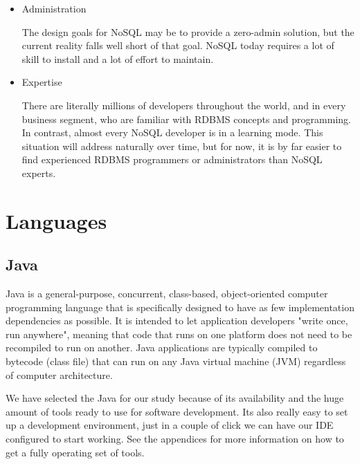 \begin{itemize}
\item Administration

The design goals for NoSQL may be to provide a zero-admin solution, but the current reality falls well short of that goal. NoSQL today requires a lot of skill to install and a lot of effort to maintain.

\item Expertise

There are literally millions of developers throughout the world, and in every business segment, who are familiar with RDBMS concepts and programming. In contrast, almost every NoSQL developer is in a learning mode. This situation will address naturally over time, but for now, it is by far easier to find experienced RDBMS programmers or administrators than NoSQL experts.

\end{itemize}

\section{Languages}

\subsection{Java}

Java is a general-purpose, concurrent, class-based, object-oriented computer programming language that is specifically designed to have as few implementation dependencies as possible. It is intended to let application developers "write once, run anywhere", meaning that code that runs on one platform does not need to be recompiled to run on another. Java applications are typically compiled to bytecode (class file) that can run on any Java virtual machine (JVM) regardless of computer architecture.

We have selected the Java for our study because of its availability and the huge amount of tools ready to use for software development. Its also really easy to set up a development environment, just in a couple of click we can have our IDE configured to start working. See the appendices for more information on how to get a fully operating set of tools.
